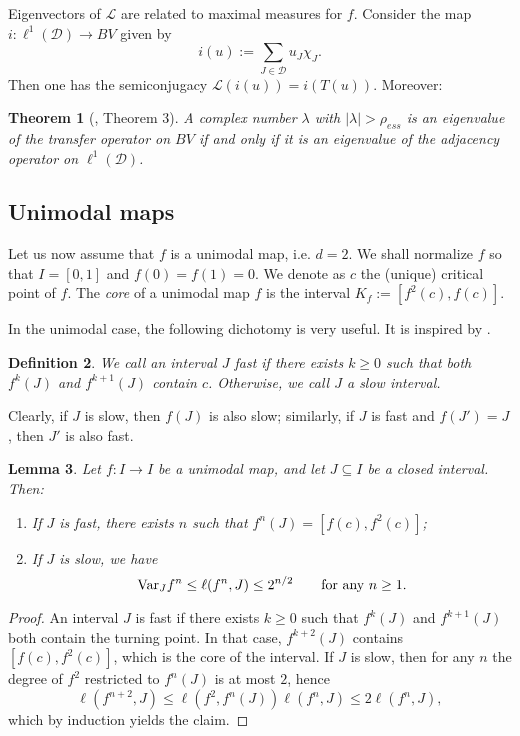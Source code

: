 \documentclass[11pt]{amsart}
\newtheorem{theorem}{Theorem}[section]
\newtheorem{lemma}[theorem]{Lemma}
\newtheorem{definition}[theorem]{Definition}
\begin{document}
Eigenvectors of $\mathcal{L}$ are related to maximal measures for $f$. Consider the map $i : \ell^1(\mathcal{D}) \to BV$ given by 
$$i(u) := \sum_{J \in \mathcal{D}} u_J \chi_J.$$
Then one has the semiconjugacy $\mathcal{L}(i(u)) = i(T(u))$. Moreover:

\begin{theorem}[\cite{HK}, Theorem 3]
A complex number $\lambda$ with $|\lambda| > \rho_{ess}$ is an eigenvalue of the transfer operator on $BV$ if and only if it is an eigenvalue of the adjacency operator on $\ell^1(\mathcal{D})$. 
\end{theorem}

\subsection{Unimodal maps}
Let us now assume that $f$ is a unimodal map, i.e. $d = 2$. We shall normalize $f$ so that $I = [0, 1]$ and $f(0) = f(1) = 0$. 
We denote as $c$ the (unique) critical point of $f$.  The \emph{core} of a unimodal map $f$ is the interval $K_f := [f^2(c), f(c)]$.

In the unimodal case, the following dichotomy is very useful. It is inspired by \cite[Proposition 2.5.5]{vS}.

\begin{definition}
We call an interval $J$ \emph{fast} if there exists $k \geq 0$ such that both $f^{k}(J)$ and $f^{k+1}(J)$ contain $c$.  
Otherwise, we call $J$ a \emph{slow interval}. 
\end{definition}

Clearly, if $J$ is slow, then $f(J)$ is also slow; similarly, if $J$ is fast and $f(J') = J$, then $J'$ is also fast. 

\begin{lemma}
Let $f : I \to I$ be a unimodal map, and let $J \subseteq I$ be a closed interval. Then: 
\begin{enumerate}
\item If $J$ is fast, there exists $n$ such that $f^n(J) = [f(c), f^2(c)]$; 
\item If $J$ is slow, we have 
$$\textup{Var}_J f^n \leq \ell(f^n, J) \leq 2^{n/2} \qquad \textup{for any }n \geq 1.$$ 
\end{enumerate}
\end{lemma}

\begin{proof}
An interval $J$ is fast if there exists $k \geq 0$ such that $f^k(J)$ and $f^{k+1}(J)$ both contain the turning point. 
In that case, $f^{k+2}(J)$ contains $[f(c), f^2(c)]$, which is the core of the interval. 
If $J$ is slow, then for any $n$ the degree of $f^2$ restricted to $f^n(J)$ is at most $2$, hence 
$$\ell(f^{n+2}, J) \leq \ell(f^2, f^n(J)) \ell(f^n, J) \leq 2 \ell(f^n, J),$$
which by induction yields the claim.
\end{proof}
\end{document}

